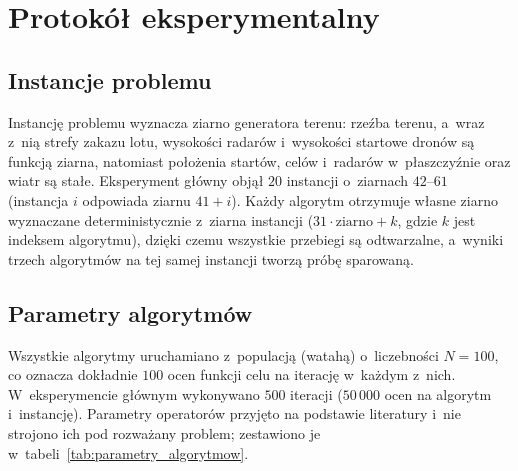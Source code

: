 \section{Protokół eksperymentalny}
\label{sec:wyniki_protokol}

\subsection{Instancje problemu}
\label{sec:wyniki_instancje}
Instancję problemu wyznacza ziarno generatora terenu: rzeźba terenu, a~wraz
z~nią strefy zakazu lotu, wysokości radarów i~wysokości startowe dronów są
funkcją ziarna, natomiast położenia startów, celów i~radarów w~płaszczyźnie
oraz wiatr są stałe. Eksperyment główny objął $20$ instancji o~ziarnach
$42$--$61$ (instancja $i$ odpowiada ziarnu $41 + i$). Każdy algorytm otrzymuje
własne ziarno wyznaczane deterministycznie z~ziarna instancji
($31 \cdot \text{ziarno} + k$, gdzie $k$ jest indeksem algorytmu), dzięki czemu
wszystkie przebiegi są odtwarzalne, a~wyniki trzech algorytmów na tej samej
instancji tworzą próbę sparowaną.

\subsection{Parametry algorytmów}
\label{sec:wyniki_parametry}
Wszystkie algorytmy uruchamiano z~populacją (watahą) o~liczebności $N = 100$,
co oznacza dokładnie $100$ ocen funkcji celu na iterację w~każdym z~nich.
W~eksperymencie głównym wykonywano $500$ iteracji ($50\,000$ ocen na algorytm
i~instancję). Parametry operatorów przyjęto na podstawie literatury i~nie
strojono ich pod rozważany problem; zestawiono je w~tabeli~\ref{tab:parametry_algorytmow}.

